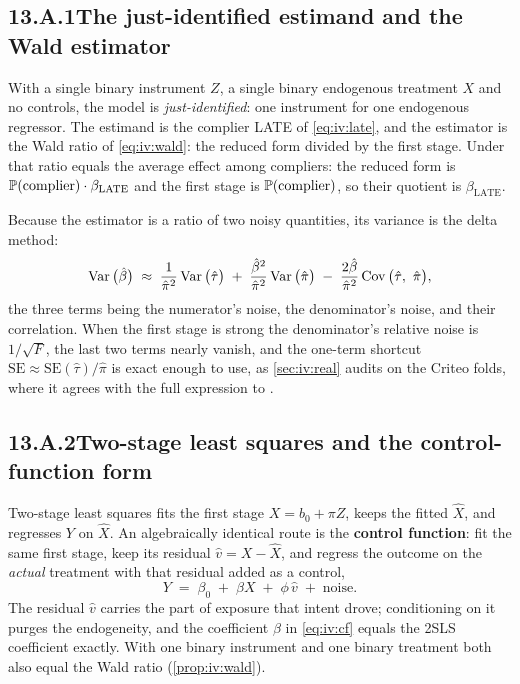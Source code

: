 \subsection*{13.A.1\quad The just-identified estimand and the Wald estimator}

With a single binary instrument $Z$, a single binary endogenous treatment $X$ and no controls, the
model is \emph{just-identified}: one instrument for one endogenous regressor. The estimand is the
complier LATE of \cref{eq:iv:late}, and the estimator is the Wald ratio of \cref{eq:iv:wald}: the
reduced form divided by the first stage. Under  that ratio equals
the average effect among compliers: the reduced form is $\operatorname{\mathbb{P}}(\text{complier})\cdot\beta_{\text{LATE}}$
and the first stage is $\operatorname{\mathbb{P}}(\text{complier})$, so their quotient is $\beta_{\text{LATE}}$.

Because the estimator is a ratio of two noisy quantities, its variance is the delta method:
%
\begin{equation}
  \Var\big(\hat\beta\big) \;\approx\;
    \frac{1}{\hat\pi^{2}}\Var\big(\hat\tau\big)
  \;+\; \frac{\hat\beta^{2}}{\hat\pi^{2}}\Var\big(\hat\pi\big)
  \;-\; \frac{2\hat\beta}{\hat\pi^{2}}\operatorname{Cov}\big(\hat\tau,\ \hat\pi\big),
  \label{eq:iv:delta}
\end{equation}
%
the three terms being the numerator's noise, the denominator's noise, and their correlation. When
the first stage is strong the denominator's relative noise is $1/\sqrt F$, the last two terms nearly
vanish, and the one-term shortcut $\text{SE} \approx \text{SE}(\hat\tau)/\hat\pi$ is exact enough to
use, as \cref{sec:iv:real} audits on the Criteo folds, where it agrees with the full expression to
\pc{\nbElevenBSeShortGap}.

\subsection*{13.A.2\quad Two-stage least squares and the control-function form}

Two-stage least squares fits the first stage $X = b_0 + \pi Z$, keeps the fitted $\hat X$, and
regresses $Y$ on $\hat X$. An algebraically identical route is the \textbf{control function}: fit the
same first stage, keep its residual $\hat v = X - \hat X$, and regress the outcome on the
\emph{actual} treatment with that residual added as a control,
%
\begin{equation}
  Y \;=\; \beta_0 \;+\; \beta X \;+\; \phi\,\hat v \;+\; \text{noise}.
  \label{eq:iv:cf}
\end{equation}
%
The residual $\hat v$ carries the part of exposure that intent drove; conditioning on it purges the
endogeneity, and the coefficient $\beta$ in \cref{eq:iv:cf} equals the 2SLS coefficient exactly. With
one binary instrument and one binary treatment both also equal the Wald ratio (\cref{prop:iv:wald}).

